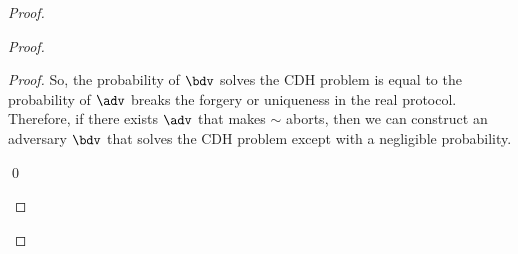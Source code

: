 \begin{proof}
\begin{proof}
\begin{proof}
			So, the probability of $ \bdv $ solves the CDH problem is equal to the probability of $ \adv $ breaks the forgery or uniqueness in the real protocol. Therefore,  if there exists $ \adv $ that makes $ \sim$ aborts, then we can construct an adversary $ \bdv $ that solves the CDH problem except with a negligible probability.
			
			
			\qed	  
		\end{proof}
		
	\end{proof}
\end{proof}
